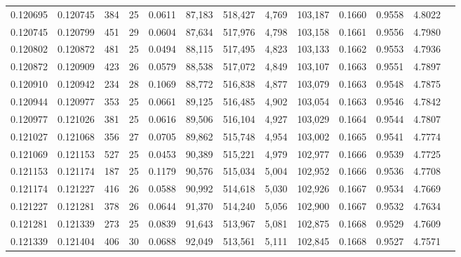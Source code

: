 \begin{tabular}{rrrrrrrrrrrrr}
0.120695 & 0.120745 & 384 &  25 &                                     0.0611 &  87,183 & 518,427 &   4,769 & 103,187 & 0.1660 & 0.9558 & 4.8022 \\
0.120745 & 0.120799 & 451 &  29 &                                     0.0604 &  87,634 & 517,976 &   4,798 & 103,158 & 0.1661 & 0.9556 & 4.7980 \\
0.120802 & 0.120872 & 481 &  25 &                                     0.0494 &  88,115 & 517,495 &   4,823 & 103,133 & 0.1662 & 0.9553 & 4.7936 \\
0.120872 & 0.120909 & 423 &  26 &                                     0.0579 &  88,538 & 517,072 &   4,849 & 103,107 & 0.1663 & 0.9551 & 4.7897 \\
0.120910 & 0.120942 & 234 &  28 &                                     0.1069 &  88,772 & 516,838 &   4,877 & 103,079 & 0.1663 & 0.9548 & 4.7875 \\
0.120944 & 0.120977 & 353 &  25 &                                     0.0661 &  89,125 & 516,485 &   4,902 & 103,054 & 0.1663 & 0.9546 & 4.7842 \\
0.120977 & 0.121026 & 381 &  25 &                                     0.0616 &  89,506 & 516,104 &   4,927 & 103,029 & 0.1664 & 0.9544 & 4.7807 \\
0.121027 & 0.121068 & 356 &  27 &                                     0.0705 &  89,862 & 515,748 &   4,954 & 103,002 & 0.1665 & 0.9541 & 4.7774 \\
0.121069 & 0.121153 & 527 &  25 &                                     0.0453 &  90,389 & 515,221 &   4,979 & 102,977 & 0.1666 & 0.9539 & 4.7725 \\
0.121153 & 0.121174 & 187 &  25 &                                     0.1179 &  90,576 & 515,034 &   5,004 & 102,952 & 0.1666 & 0.9536 & 4.7708 \\
0.121174 & 0.121227 & 416 &  26 &                                     0.0588 &  90,992 & 514,618 &   5,030 & 102,926 & 0.1667 & 0.9534 & 4.7669 \\
0.121227 & 0.121281 & 378 &  26 &                                     0.0644 &  91,370 & 514,240 &   5,056 & 102,900 & 0.1667 & 0.9532 & 4.7634 \\
0.121281 & 0.121339 & 273 &  25 &                                     0.0839 &  91,643 & 513,967 &   5,081 & 102,875 & 0.1668 & 0.9529 & 4.7609 \\
0.121339 & 0.121404 & 406 &  30 &                                     0.0688 &  92,049 & 513,561 &   5,111 & 102,845 & 0.1668 & 0.9527 & 4.7571 \\

\end{tabular}
